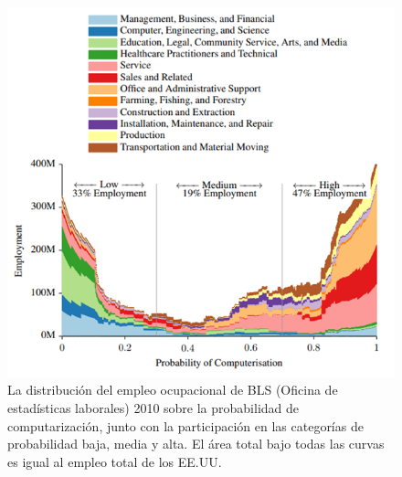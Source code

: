    \begin{figure}[htb]
        \centering
        \includegraphics[width=1\linewidth]{Main/Chapter2/Images2/distribucion-del-empleo.png}
        \caption{La distribución del empleo ocupacional de BLS (Oficina de estadísticas laborales) 2010 sobre la probabilidad de computarización, junto con la participación en las categorías de probabilidad baja, media y alta. El área total bajo todas las curvas es igual al empleo total de los EE.UU.}
        \label{f:Cap2_general_distribucion_empleo}
    \end{figure}
    
        \newpage


